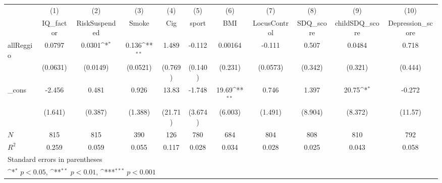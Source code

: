 {
\def\sym#1{\ifmmode^{#1}\else\(^{#1}\)\fi}
\begin{tabular}{l*{10}{c}}
\toprule
            &\multicolumn{1}{c}{(1)}&\multicolumn{1}{c}{(2)}&\multicolumn{1}{c}{(3)}&\multicolumn{1}{c}{(4)}&\multicolumn{1}{c}{(5)}&\multicolumn{1}{c}{(6)}&\multicolumn{1}{c}{(7)}&\multicolumn{1}{c}{(8)}&\multicolumn{1}{c}{(9)}&\multicolumn{1}{c}{(10)}\\
            &\multicolumn{1}{c}{IQ\_factor}&\multicolumn{1}{c}{RiskSuspended}&\multicolumn{1}{c}{Smoke}&\multicolumn{1}{c}{Cig}&\multicolumn{1}{c}{sport}&\multicolumn{1}{c}{BMI}&\multicolumn{1}{c}{LocusControl}&\multicolumn{1}{c}{SDQ\_score}&\multicolumn{1}{c}{childSDQ\_score}&\multicolumn{1}{c}{Depression\_score}\\
\midrule
allReggio   &      0.0797         &      0.0301\sym{*}  &       0.136\sym{**} &       1.489         &      -0.112         &     0.00164         &      -0.111         &       0.507         &      0.0484         &       0.718         \\
            &    (0.0631)         &    (0.0149)         &    (0.0521)         &     (0.769)         &     (0.140)         &     (0.231)         &    (0.0573)         &     (0.342)         &     (0.321)         &     (0.444)         \\
\addlinespace
\_cons      &      -2.456         &       0.481         &       0.926         &       13.83         &      -1.748         &       19.69\sym{**} &       0.746         &       1.397         &       20.75\sym{*}  &      -0.272         \\
            &     (1.641)         &     (0.387)         &     (1.388)         &     (21.71)         &     (3.674)         &     (6.003)         &     (1.491)         &     (8.904)         &     (8.372)         &     (11.57)         \\
\midrule
\(N\)       &         815         &         815         &         390         &         126         &         780         &         684         &         804         &         808         &         810         &         792         \\
\(R^{2}\)   &       0.259         &       0.059         &       0.055         &       0.117         &       0.028         &       0.034         &       0.028         &       0.025         &       0.043         &       0.058         \\
\bottomrule
\multicolumn{11}{l}{\footnotesize Standard errors in parentheses}\\
\multicolumn{11}{l}{\footnotesize \sym{*} \(p<0.05\), \sym{**} \(p<0.01\), \sym{***} \(p<0.001\)}\\
\end{tabular}
}
